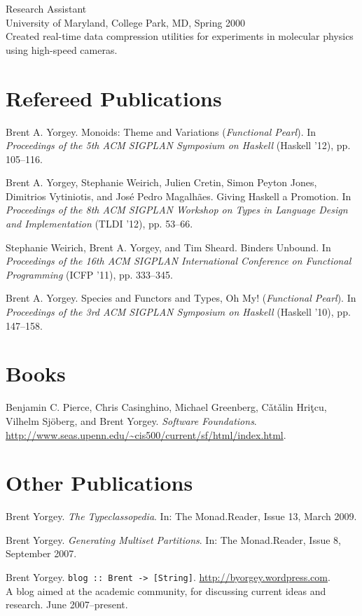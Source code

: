\documentclass{article}
\newcommand{\cvitem}{\par\hangpara{2em}{1}}
\begin{document}
\cvitem
Research Assistant \\
University of Maryland, College Park, MD, Spring 2000 \\
Created real-time data compression utilities for experiments in
molecular physics using high-speed cameras.

\section*{Refereed Publications}

\cvitem Brent A. Yorgey. Monoids: Theme and Variations
(\emph{Functional Pearl}).  In \emph{Proceedings of the 5th ACM
  SIGPLAN Symposium on Haskell} (Haskell '12), pp. 105--116.

\cvitem Brent A. Yorgey, Stephanie Weirich, Julien Cretin, Simon
Peyton Jones, Dimitrios Vytiniotis, and Jos\'e Pedro
Magalh\~aes. Giving Haskell a Promotion. In \emph{Proceedings of the
  8th ACM SIGPLAN Workshop on Types in Language Design and
  Implementation} (TLDI '12), pp. 53--66.

\cvitem Stephanie Weirich, Brent A. Yorgey, and Tim Sheard. Binders
  Unbound. In \emph{Proceedings of the 16th ACM SIGPLAN International
    Conference on Functional Programming} (ICFP '11), pp. 333--345.

\cvitem Brent A. Yorgey. Species and Functors and Types, Oh
  My! (\emph{Functional Pearl}). In \emph{Proceedings of the 3rd ACM SIGPLAN
  Symposium on Haskell} (Haskell '10), pp. 147--158.

\section*{Books}
\cvitem Benjamin C. Pierce, Chris Casinghino, Michael Greenberg,
C{\v a}t{\v a}lin Hri{\c t}cu, Vilhelm Sj\"oberg, and Brent Yorgey. \emph{Software
  Foundations}. \url{http://www.seas.upenn.edu/~cis500/current/sf/html/index.html}.

\section*{Other Publications}
\cvitem Brent Yorgey. \emph{The Typeclassopedia}. In: The
Monad.Reader, Issue 13, March 2009.

\cvitem Brent Yorgey. \emph{Generating Multiset Partitions}.  In: The
Monad.Reader, Issue 8, September 2007.

\cvitem Brent Yorgey. \texttt{blog :: Brent ->
  [String]}. \url{http://byorgey.wordpress.com}.  \\
A blog aimed at the academic community, for discussing current ideas
and research.  June 2007--present.
\end{document}
